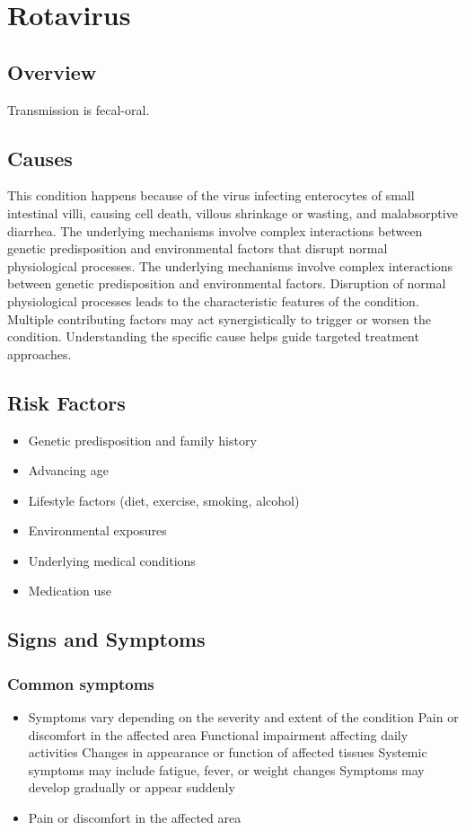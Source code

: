 \chapter{Rotavirus}
\label{sec:Rotavirus}

\section{Overview}
Transmission is fecal-oral.
\section{Causes}
This condition happens because of the virus infecting enterocytes of small intestinal villi, causing cell death, villous shrinkage or wasting, and malabsorptive diarrhea. The underlying mechanisms involve complex interactions between genetic predisposition and environmental factors that disrupt normal physiological processes. The underlying mechanisms involve complex interactions between genetic predisposition and environmental factors. Disruption of normal physiological processes leads to the characteristic features of the condition. Multiple contributing factors may act synergistically to trigger or worsen the condition. Understanding the specific cause helps guide targeted treatment approaches.
\section{Risk Factors}


\begin{itemize}[noitemsep]
  \item Genetic predisposition and family history
  \item Advancing age
  \item Lifestyle factors (diet, exercise, smoking, alcohol)
  \item Environmental exposures
  \item Underlying medical conditions
  \item Medication use
\end{itemize}
\section{Signs and Symptoms}

\subsection{Common symptoms}
\begin{itemize}[noitemsep]
  \item Symptoms vary depending on the severity and extent of the condition Pain or discomfort in the affected area Functional impairment affecting daily activities Changes in appearance or function of affected tissues Systemic symptoms may include fatigue, fever, or weight changes Symptoms may develop gradually or appear suddenly
  \item Pain or discomfort in the affected area
  \end{itemize}

